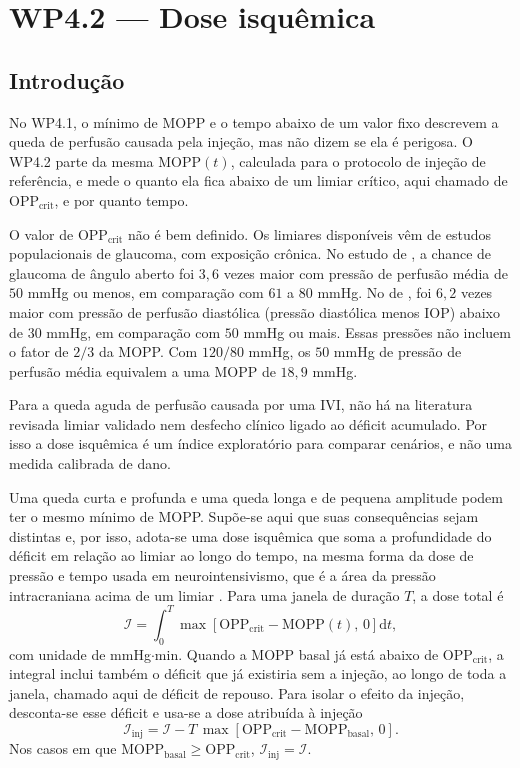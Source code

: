 \section{WP4.2 --- Dose isquêmica}
\label{sec_wp42}

\subsection{Introdução}

No WP4.1, o mínimo de MOPP e o tempo abaixo de um valor fixo descrevem a queda de perfusão causada pela injeção, mas não dizem se ela é perigosa. O WP4.2 parte da mesma $\mathrm{MOPP}(t)$, calculada para o protocolo de injeção de referência, e mede o quanto ela fica abaixo de um limiar crítico, aqui chamado de $\mathrm{OPP}_{\text{crit}}$, e por quanto tempo.

O valor de $\mathrm{OPP}_{\text{crit}}$ não é bem definido. Os limiares disponíveis vêm de estudos populacionais de glaucoma, com exposição crônica. No estudo de \citet{memarzadeh2010}, a chance de glaucoma de ângulo aberto foi $3{,}6$ vezes maior com pressão de perfusão média de $50$ mmHg ou menos, em comparação com $61$ a $80$ mmHg. No de \citet{tielsch1995}, foi $6{,}2$ vezes maior com pressão de perfusão diastólica (pressão diastólica menos IOP) abaixo de $30$ mmHg, em comparação com $50$ mmHg ou mais. Essas pressões não incluem o fator de $2/3$ da MOPP. Com $120/80$ mmHg, os $50$ mmHg de pressão de perfusão média equivalem a uma MOPP de $18{,}9$ mmHg.

Para a queda aguda de perfusão causada por uma IVI, não há na literatura revisada limiar validado nem desfecho clínico ligado ao déficit acumulado. Por isso a dose isquêmica é um índice exploratório para comparar cenários, e não uma medida calibrada de dano.

Uma queda curta e profunda e uma queda longa e de pequena amplitude podem ter o mesmo mínimo de MOPP. Supõe-se aqui que suas consequências sejam distintas e, por isso, adota-se uma dose isquêmica que soma a profundidade do déficit em relação ao limiar ao longo do tempo, na mesma forma da dose de pressão e tempo usada em neurointensivismo, que é a área da pressão intracraniana acima de um limiar \citep{vik2008,kahraman2010,akerlund2020}. Para uma janela de duração $T$, a dose total é
\begin{equation}
\mathcal{I}=\int_{0}^{T}\max\!\left[\mathrm{OPP}_{\text{crit}}-\mathrm{MOPP}(t),\,0\right]\mathrm{d}t,
\label{eq_wp42_dose}
\end{equation}
com unidade de mmHg$\cdot$min. Quando a MOPP basal já está abaixo de $\mathrm{OPP}_{\text{crit}}$, a integral inclui também o déficit que já existiria sem a injeção, ao longo de toda a janela, chamado aqui de déficit de repouso. Para isolar o efeito da injeção, desconta-se esse déficit e usa-se a dose atribuída à injeção
\begin{equation}
\mathcal{I}_{\mathrm{inj}}=\mathcal{I}-T\,\max\!\left[\mathrm{OPP}_{\text{crit}}-\mathrm{MOPP}_{\text{basal}},\,0\right].
\label{eq_wp42_Ievt}
\end{equation}
Nos casos em que $\mathrm{MOPP}_{\text{basal}}\ge\mathrm{OPP}_{\text{crit}}$, $\mathcal{I}_{\mathrm{inj}}=\mathcal{I}$.


